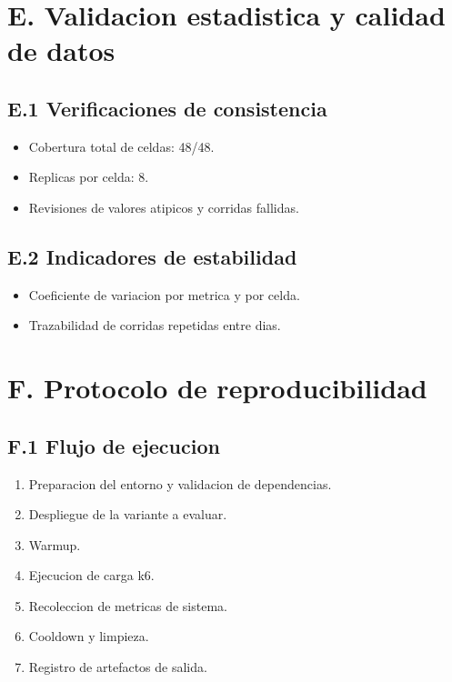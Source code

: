 \section{E. Validacion estadistica y calidad de datos}
\label{anx:validacion}

\subsection{E.1 Verificaciones de consistencia}
\begin{itemize}
  \item Cobertura total de celdas: 48/48.
  \item Replicas por celda: 8.
  \item Revisiones de valores atipicos y corridas fallidas.
\end{itemize}

\subsection{E.2 Indicadores de estabilidad}
\begin{itemize}
  \item Coeficiente de variacion por metrica y por celda.
  \item Trazabilidad de corridas repetidas entre dias.
\end{itemize}

\section{F. Protocolo de reproducibilidad}
\label{anx:protocolo}

\subsection{F.1 Flujo de ejecucion}
\begin{enumerate}
  \item Preparacion del entorno y validacion de dependencias.
  \item Despliegue de la variante a evaluar.
  \item Warmup.
  \item Ejecucion de carga k6.
  \item Recoleccion de metricas de sistema.
  \item Cooldown y limpieza.
  \item Registro de artefactos de salida.
\end{enumerate}


